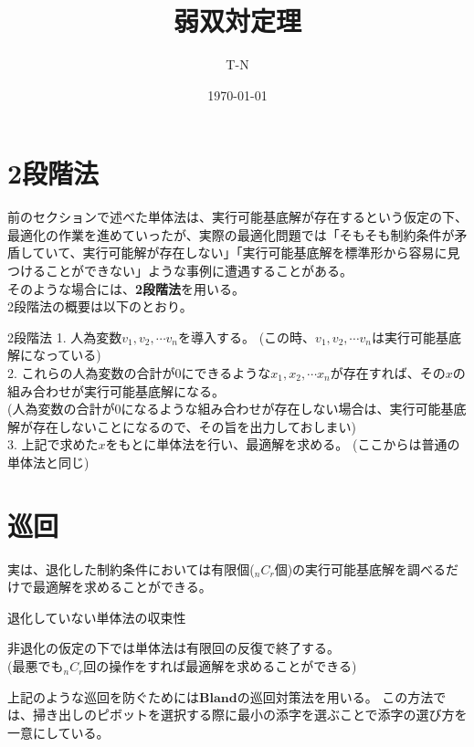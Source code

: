 \documentclass[platex,dvipdfmx]{jlreq}			%
\title{弱双対定理}
\author{T-N}
\date{\today}
\begin{document}
\maketitle
\section{2段階法}

前のセクションで述べた単体法は、実行可能基底解が存在するという仮定の下、最適化の作業を進めていったが、実際の最適化問題では「そもそも制約条件が矛盾していて、実行可能解が存在しない」「実行可能基底解を標準形から容易に見つけることができない」ような事例に遭遇することがある。
\\
そのような場合には、\textbf{2段階法}を用いる。\\
2段階法の概要は以下のとおり。

\begin{itembox}[l]{2段階法}
1. 人為変数$v_1, v_2, \cdots  v_n$を導入する。
(この時、$v_1, v_2, \cdots  v_n$は実行可能基底解になっている)\\
2. これらの人為変数の合計が0にできるような$x_1, x_2, \cdots x_n$が存在すれば、その$x$の組み合わせが実行可能基底解になる。\\
(人為変数の合計が0になるような組み合わせが存在しない場合は、実行可能基底解が存在しないことになるので、その旨を出力しておしまい)\\
3. 上記で求めた$x$をもとに単体法を行い、最適解を求める。
(ここからは普通の単体法と同じ)
\end{itembox}



\section{巡回}
実は、退化した制約条件においては有限個(${}_n C_r$個)の実行可能基底解を調べるだけで最適解を求めることができる。
\\
\begin{itembox}[l]{退化していない単体法の収束性}

非退化の仮定の下では単体法は有限回の反復で終了する。\\
(最悪でも${}_n C_r$回の操作をすれば最適解を求めることができる)
\end{itembox}



上記のような$\textbf{巡回}$を防ぐためには$\textbf{Blandの巡回対策法}$を用いる。
この方法では、掃き出しのピボットを選択する際に最小の添字を選ぶことで添字の選び方を一意にしている。
\end{document}

